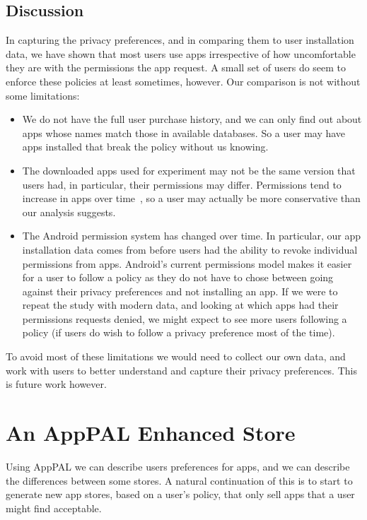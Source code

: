\documentclass[thesis.tex]{subfiles}
\begin{document}
\subsection{Discussion}

In capturing the privacy preferences, and in comparing them to user
installation data, we have shown that most users use apps irrespective
of how uncomfortable they are with the permissions the app request.  A
small set of users do seem to enforce these policies at least
sometimes, however.  Our comparison is not without some limitations:

\begin{itemize}
\item We do not have the full user purchase history, and we can only
  find out about apps whose names match those in available databases. So
  a user may have apps installed that break the policy without us
  knowing.

\item The downloaded apps used for experiment may not be the same
  version that users had, in particular, their permissions may
  differ. Permissions tend to increase in apps over
  time~\cite{wei_permission_2012}, so a user may actually be more
  conservative than our analysis suggests.

\item The Android permission system has changed over time.  In
  particular, our app installation data comes from before users had the
  ability to revoke individual permissions from apps.  Android's current
  permissions model makes it easier for a user to follow a policy as
  they do not have to chose between going against their privacy
  preferences and not installing an app.  If we were to repeat the study
  with modern data, and looking at which apps had their permissions
  requests denied, we might expect to see more users following a policy
  (if users do wish to follow a privacy preference most of the time).
\end{itemize}

To avoid most of these limitations we would need to collect our own
data, and work with users to better understand and capture their
privacy preferences.  This is future work however.

\section{An AppPAL Enhanced Store}
\label{sec:an-apppal-enhanced-store}

Using AppPAL we can describe users preferences for apps, and we can describe
the differences between some stores.  A natural continuation of this is
to start to generate new app stores, based on a user's policy, that only sell
apps that a user might find acceptable.
\end{document}

